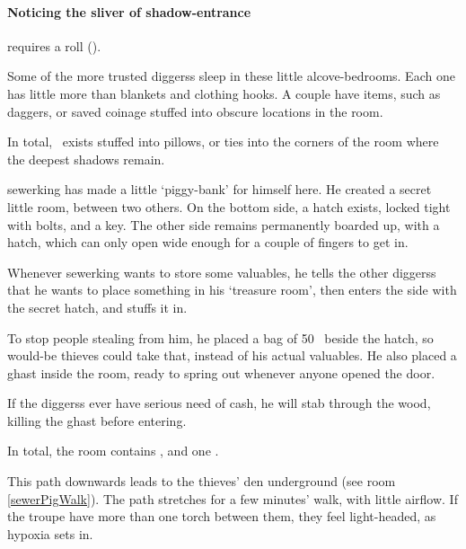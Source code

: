 \begin{multicols}{2}
\paragraph{Noticing the sliver of shadow-entrance}
requires a  roll (\tn[9]).


Some of the more trusted \glspl{diggers} sleep in these little alcove-bedrooms.
Each one has little more than blankets and clothing hooks.
A couple have items, such as daggers, or saved coinage stuffed into obscure locations in the room.

In total, \lootMedium\ exists stuffed into pillows, or ties into the corners of the room where the deepest shadows remain.


\Gls{sewerking} has made a little `piggy-bank' for himself here.
He created a secret little room, between two others.
On the bottom side, a hatch exists, locked tight with bolts, and a key.
The other side remains permanently boarded up, with a hatch, which can only open wide enough for a couple of fingers to get in.

Whenever \gls{sewerking} wants to store some valuables, he tells the other \glspl{diggers} that he wants to place something in his `treasure room', then enters the side with the secret hatch, and stuffs it in.

To stop people stealing from him, he placed a bag of 50~ beside the hatch, so would-be thieves could take that, instead of his actual valuables.
He also placed a ghast inside the room, ready to spring out whenever anyone opened the door.

If the \glspl{diggers} ever have serious need of cash, he will stab through the wood, killing the ghast before entering.


In total, the room contains \lootBig, and one \lootTalisman.

\showTalisman

This path downwards leads to the thieves' den underground (see room \vref{sewerPigWalk}).
The path stretches for a few minutes' walk, with little airflow.
If the troupe have more than one torch between them, they feel light-headed, as \gls{hypoxia} sets in.

\end{multicols}
